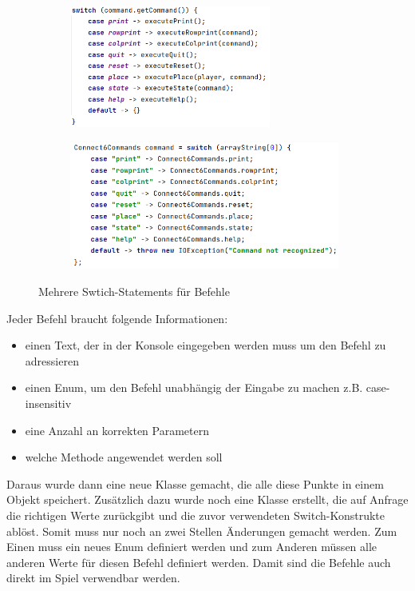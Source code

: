 \documentclass[12pt]{article}
\begin{document}
\begin{figure}[htpb!]
\centering
\begin{subfigure}{.4\textwidth}
  \centering
  {\includegraphics[height=4cm]{Bilder/Switch}}
  \label{fig:sub1}
\end{subfigure}%
\begin{subfigure}{.6\textwidth}
  \centering
  {\includegraphics[height=4.2cm]{Bilder/Switch2}}
  \label{fig:sub2}
\end{subfigure}
\caption{Mehrere Swtich-Statements für Befehle}
\label{fig:test}
\end{figure}

\noindent Jeder Befehl braucht folgende Informationen: 
\begin{itemize}
\item einen Text, der in der Konsole eingegeben werden muss um den Befehl zu adressieren
\item einen Enum, um den Befehl unabhängig der Eingabe zu machen z.B. case-insensitiv
\item eine Anzahl an korrekten Parametern
\item welche Methode angewendet werden soll
\end{itemize}

\noindent Daraus wurde dann eine neue Klasse gemacht, die alle diese Punkte in einem Objekt speichert. Zusätzlich dazu wurde noch eine Klasse erstellt, die auf Anfrage die richtigen Werte zurückgibt und die zuvor verwendeten Switch-Konstrukte ablöst. Somit muss nur noch an zwei Stellen Änderungen gemacht werden. Zum Einen muss ein neues Enum definiert werden und zum Anderen müssen alle anderen Werte für diesen Befehl definiert werden. Damit sind die Befehle auch direkt im Spiel verwendbar werden.
\end{document}
